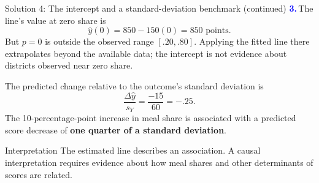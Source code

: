 \documentclass[notes,10pt, aspectratio=169]{beamer}
\newcommand{\answerpart}[1]{\textcolor{blue}{\textbf{#1.}}\,}
\begin{document}
\begin{frame}{Solution 4: The intercept and a standard-deviation benchmark (continued)}
\small
\answerpart{3}The line's value at zero share is
\[
\widehat y(0)=850-150(0)=\boxed{850\text{ points}}.
\]
But $p=0$ is outside the observed range $[.20,.80]$. Applying the fitted line there extrapolates beyond the available data; the intercept is not evidence about districts observed near zero share.
\par\vspace{10pt}
The predicted change relative to the outcome's standard deviation is
\[
\frac{\Delta\widehat y}{s_Y}
=\frac{-15}{60}=\boxed{-.25}.
\]
The 10-percentage-point increase in meal share is associated with a predicted score decrease of \textbf{one quarter of a standard deviation}.
\begin{block}{Interpretation}
The estimated line describes an association. A causal interpretation requires evidence about how meal shares and other determinants of scores are related.
\end{block}
\end{frame}
\fi
\end{document}
